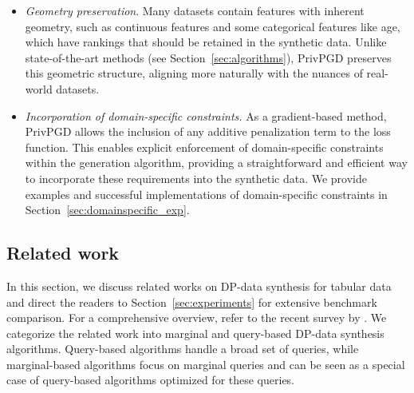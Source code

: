 \begin{itemize}
\item \textit{Geometry preservation}. Many datasets contain features with inherent geometry, such as continuous features and some categorical features like age, which have rankings that should be retained in the synthetic data. Unlike state-of-the-art methods (see Section~\ref{sec:algorithms}), PrivPGD preserves this geometric structure, aligning more naturally with the nuances of real-world datasets.


\item \textit{Incorporation of domain-specific constraints.} As a gradient-based method, PrivPGD allows the inclusion of any additive penalization term to the loss function. This enables explicit enforcement of domain-specific constraints within the generation algorithm, providing a straightforward and efficient way to incorporate these requirements into the synthetic data. We provide examples and successful implementations of domain-specific constraints in Section~\ref{sec:domainspecific_exp}.

\end{itemize}

\subsection{Related work}
\label{sec:relatedwork}




In this section, we discuss related works on DP-data synthesis for tabular data and direct the readers to Section~\ref{sec:experiments} for extensive benchmark comparison. For a comprehensive overview, refer to the recent survey by \citet{hu2023sok}. We categorize the related work into marginal and query-based DP-data synthesis algorithms. Query-based algorithms handle a broad set of queries, while marginal-based algorithms focus on marginal queries and can be seen as a special case of query-based algorithms optimized for these queries.

